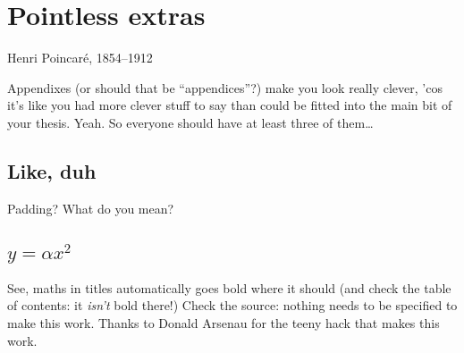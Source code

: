 \chapter{Pointless extras}
\label{app:Pointless}

%
{Henri Poincar\'e, 1854--1912}

Appendixes (or should that be ``appendices''?) make you look really clever, 'cos
it's like you had more clever stuff to say than could be fitted into the main
bit of your thesis. Yeah. So everyone should have at least three of them\dots

\section{Like, duh}
\label{sec:Duh}
Padding? What do you mean?

\section{$y = \alpha x^2$}
\label{sec:EqnTitle}
See, maths in titles automatically goes bold where it should (and check the 
table of contents: it \emph{isn't} bold there!) Check the source: nothing
needs to be specified to make this work. Thanks to Donald Arsenau for the
teeny hack that makes this work.

%
